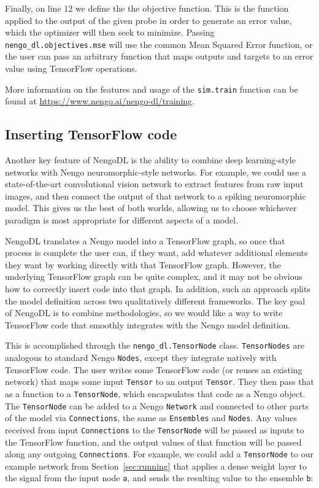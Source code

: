 \documentclass{article}
\begin{document}
Finally, on line 12 we define the the objective function.  This is the function applied to the output of the given probe in order to generate an error value, which the optimizer will then seek to minimize.  Passing \texttt{nengo\_dl.objectives.mse} will use the common Mean Squared Error function, or the user can pass an arbitrary function that maps outputs and targets to an error value using TensorFlow operations.

More information on the features and usage of the \texttt{sim.train} function can be found at \url{https://www.nengo.ai/nengo-dl/training}.

\subsection{Inserting TensorFlow code}
\label{sec:tensornode}

Another key feature of NengoDL is the ability to combine deep learning-style networks with Nengo neuromorphic-style networks.  For example, we could use a state-of-the-art convolutional vision network to extract features from raw input images, and then connect the output of that network to a spiking neuromorphic model.  This gives us the best of both worlds, allowing us to choose whichever paradigm is most appropriate for different aspects of a model.

NengoDL translates a Nengo model into a TensorFlow graph, so once that process is complete the user can, if they want, add whatever additional elements they want by working directly with that TensorFlow graph.  However, the underlying TensorFlow graph can be quite complex, and it may not be obvious how to correctly insert code into that graph.  In addition, such an approach splits the model definition across two qualitatively different frameworks.  The key goal of NengoDL is to combine methodologies, so we would like a way to write TensorFlow code that smoothly integrates with the Nengo model definition.

This is accomplished through the \texttt{nengo\_dl.TensorNode} class.  \texttt{TensorNodes} are analogous to standard Nengo \texttt{Nodes}, except they integrate natively with TensorFlow code.  The user writes some TensorFlow code (or reuses an existing network) that maps some input \texttt{Tensor} to an output \texttt{Tensor}.  They then pass that as a function to a \texttt{TensorNode}, which encapsulates that code as a Nengo object.  The \texttt{TensorNode} can be added to a Nengo \texttt{Network} and connected to other parts of the model via \texttt{Connections}, the same as \texttt{Ensembles} and \texttt{Nodes}.  Any values received from input \texttt{Connections} to the \texttt{TensorNode} will be passed as inputs to the TensorFlow function, and the output values of that function will be passed along any outgoing \texttt{Connections}.  For example, we could add a \texttt{TensorNode} to our example network from Section~\ref{sec:running} that applies a dense weight layer to the signal from the input node \texttt{a}, and sends the resulting value to the ensemble \texttt{b}:
\end{document}

